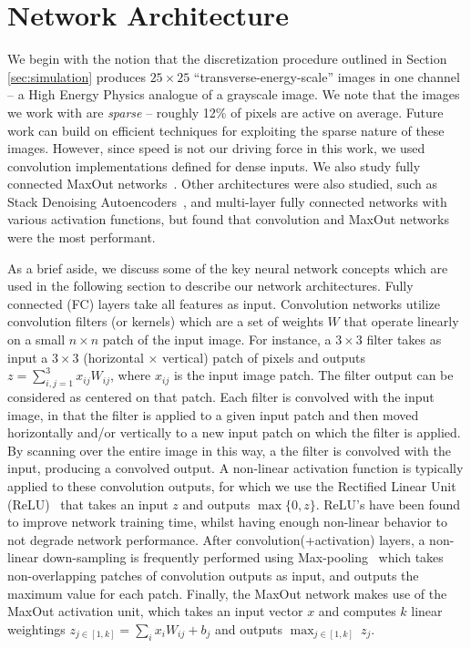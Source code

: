 
\section{Network Architecture}
\label{sec:arch}


We begin with the notion that the discretization procedure outlined in Section \ref{sec:simulation} produces $25\times 25$ ``transverse-energy-scale'' images in one channel -- a High Energy Physics analogue of a grayscale image. We note that the images we work with are \emph{sparse} -- roughly 12\% of pixels are active on average. Future work can build on efficient techniques for exploiting the sparse nature of these images. However, since speed is not our driving force in this work, we used convolution implementations defined for dense inputs.  We also study fully connected MaxOut networks~\cite{maxout:goodfellow}.  Other architectures were also studied, such as Stack Denoising Autoencoders~\cite{SDAE}, and multi-layer fully connected networks with various activation functions, but found that convolution and MaxOut networks were the most performant.

As a brief aside, we discuss some of the key neural network concepts which are used in the following section to describe our network architectures.  Fully connected (FC) layers take all features as input.  Convolution networks utilize convolution filters (or kernels) which are a set of weights $W$ that operate linearly on a small $n\times n$ patch of the input image.  For instance, a $3\times3$ filter takes as input a $3\times3$ (horizontal $\times$ vertical) patch of pixels and outputs $z = \sum_{i,j=1}^{3} x_{ij}W_{ij}$, where $x_{ij}$ is the input image patch.  The filter output can be considered as centered on that patch.  Each filter is convolved with the input image, in that the filter is applied to a given input patch and then moved horizontally and/or vertically to a new input patch on which the filter is applied.  By scanning over the entire image in this way, a the filter is convolved with the input, producing a convolved output.  A non-linear activation function is typically applied to these convolution outputs, for which we use the Rectified Linear Unit (ReLU)~\cite{RELU} that takes an input $z$ and outputs $\max\{0,z\}$. ReLU's have been found to improve network training time, whilst having enough non-linear behavior to not degrade network performance.    After convolution(+activation) layers, a non-linear down-sampling is frequently performed using Max-pooling~\cite{MAXPOOL} which takes non-overlapping patches of convolution outputs as input, and outputs the maximum value for each patch.  Finally, the MaxOut network makes use of the MaxOut activation unit, which takes an input vector $x$ and computes $k$ linear weightings $z_{j\in [1,k]} = \sum_{i} x_{i} W_{ij} + b_{j}$ and  outputs $\max_{j\in [1,k]}\ z_{j}$.  

